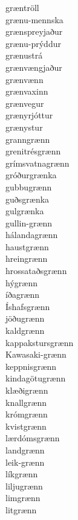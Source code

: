 \documentclass[../samsetningasafn.tex]{subfiles}
\begin{document}
\begin{bigwordlist}
\begin{footnotesize}
\begin{multicols}{4}
\begin{description}
		\item [græntröll]
		\item [grænu-mennska]
		\item [grænspreyjaður]
		\item [grænu-prýddur]
		\item [grænustrá]
		\item [grænvængjaður]
		\item [grænvænn]
		\item [grænvaxinn]
		\item [grænvegur]
		\item [grænyrjóttur]
		\item [grænystur]
		\item [granngrænn]
		\item [grenitrésgrænn]
		\item [grímsvatnagrænn]
		\item [gróðurgrænka]
		\item [gubbugrænn]
		\item [guðsgrænka]
		\item [gulgrænka]
		\item [gullin-grænn]
		\item [hálandagrænn]
		\item [haustgrænn]
		\item [hreingrænn]
		\item [hrossataðsgrænn]
		\item [hýgrænn]
		\item [íðagrænn]
		\item [Íshafsgrænn]
		\item [jöðugrænn]
		\item [kaldgrænn]
		\item [kappakstursgrænn]
		\item [Kawasaki-grænn]
		\item [keppnisgrænn]
		\item [kindagötugrænn]
		\item [klæðigrænn]
		\item [knallgrænn]
		\item [krómgrænn]
		\item [kvistgrænn]
		\item [lærdómsgrænn]
		\item [landgrænn]
		\item [leik-grænn]
		\item [líkgrænn]
		\item [liljugrænn]
		\item [limgrænn]
		\item [litgrænn]

\end{description}
\end{multicols}
\end{footnotesize}
\end{bigwordlist}
\end{document}
